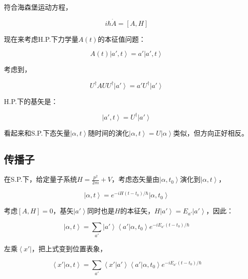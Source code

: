 符合海森堡运动方程，

\begin{equation}
i \hbar \dot A = [A, H]
\end{equation}

现在来考虑H.P.下力学量$A(t)$的本征值问题：

\begin{equation}
A(t) \left| a', t \right\rangle = a' \left| a', t \right\rangle
\end{equation}

考虑到，

\begin{equation}
U^\dagger A U U^\dagger \left| a' \right\rangle = a' U^\dagger \left| a' \right\rangle
\end{equation}

H.P.下的基矢是：

\begin{equation}
\left| a', t \right\rangle = U^\dagger \left| a' \right\rangle
\end{equation}

看起来和S.P.下态矢量$\left| \alpha , t \right\rangle$随时间的演化$\left| \alpha , t \right\rangle = U \left| \alpha \right\rangle$类似，但方向正好相反。

\subsection{传播子}

在S.P.下，给定量子系统$H = \frac{p^2}{2m} + V$，考虑态矢量由$\left| \alpha , t_0 \right\rangle$演化到$\left| \alpha , t \right\rangle$，

\begin{equation}
\left| \alpha , t \right\rangle = e^{-i H (t - t_0) / \hbar}  \left| \alpha , t_0 \right\rangle
\end{equation}

考虑$[A, H ] = 0$，基矢$\left| a' \right\rangle$同时也是$H$的本征矢，$H \left| a' \right\rangle = E_{a'} \left| a' \right\rangle $，因此：

\begin{equation}
\left| \alpha , t \right\rangle = \sum\limits_{a'} \left| a' \right\rangle \left\langle a' | \alpha, t_0 \right\rangle e^{-i E_{a'} (t - t_0) / \hbar}
\end{equation}

左乘$\left\langle x' \right|$，把上式变到位置表象，

\begin{equation}
\left\langle x' | \alpha, t \right\rangle = \sum\limits_{a'} \left\langle x' | a' \right\rangle \left\langle a' | \alpha, t_0 \right\rangle e^{- i E_{a'} (t - t_0) / \hbar}  
\end{equation}


